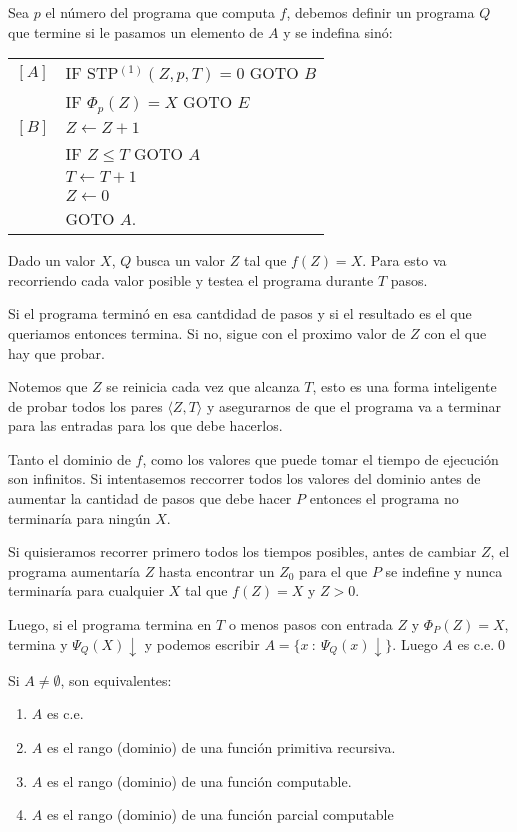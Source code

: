 \begin{demo}
	Sea $p$ el número del programa que computa $f$, debemos definir un programa $Q$ que termine si le pasamos un elemento de $A$ y se indefina sinó:
	\begin{multicols}{2}
	\begin{tabular}{ll}
	$[A]$ & IF STP$^{(1)}(Z,p,T) = 0$ GOTO $B$ \\&
	IF $\Phi_p(Z) = X$ GOTO $E$ \\
	$[B]$ & $Z \leftarrow Z + 1$ \\
	& IF $Z \leq T$ GOTO $A$ \\
	&$T \leftarrow T + 1$ \\
	&$Z\leftarrow 0$ \\
	& GOTO $A$.
\end{tabular}

\columnbreak
Dado un valor $X$, $Q$ busca un valor $Z$ tal que $f(Z) = X$. Para esto va recorriendo cada valor posible y testea el programa durante $T$ pasos. 

Si el programa terminó en esa cantdidad de pasos y si el resultado es el que queriamos entonces termina. Si no, sigue con el proximo valor de $Z$ con el que hay que probar.
	\end{multicols}

Notemos que $Z$ se reinicia cada vez que alcanza $T$, esto es una forma inteligente de probar todos los pares $\langle Z, T\rangle$ y asegurarnos de que el programa va a terminar para las entradas para los que debe hacerlos.

Tanto el dominio de $f$, como los valores que puede tomar el tiempo de ejecución son infinitos. Si intentasemos reccorrer todos los valores del dominio antes de aumentar la cantidad de pasos que debe hacer $P$ entonces el programa no terminaría para ningún $X$. 
\end{demo}
\begin{demoPart}
Si quisieramos recorrer primero todos los tiempos posibles, antes de cambiar $Z$, el programa aumentaría $Z$ hasta encontrar un $Z_0$ para el que $P$ se indefine y nunca terminaría para cualquier $X$ tal que $f(Z) = X$ y $Z > 0$. 

Luego, si el programa termina en $T$ o menos pasos con entrada $Z$ y $\Phi_P(Z) = X$, termina y $\Psi_Q(X)\downarrow$ y podemos escribir $A = \{ x~:~\Psi_Q(x)\downarrow\}$. Luego $A$ es c.e.\qed
\end{demoPart}

\begin{teorema}
	Si $A\neq\emptyset$, son equivalentes:
	\begin{enumerate}
		\item $A$ es c.e.
		\item $A$ es el rango (dominio) de una función primitiva recursiva.
		\item $A$ es el rango (dominio) de una función computable.
		\item $A$ es el rango (dominio) de una función parcial computable
	\end{enumerate}
\end{teorema}


